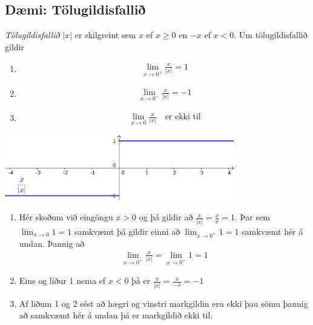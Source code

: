 \documentclass[a4paper,10pt,icelandic]{sphinxmanual}
\begin{document}
\subsection{Dæmi: Tölugildisfallið}
\label{kafli02:daemi-tolugildisfalli}
\textit{Tölugildisfallið} \(|x|\) er skilgreint sem \(x\)
ef \(x\geq 0\) en \(-x\) ef \(x<0\). Um tölugildisfallið gildir
\begin{enumerate}
\item {} \begin{equation*}
\begin{split}\lim_{x\to 0^+} \frac x{|x|} = 1\end{split}
\end{equation*}
\item {} \begin{equation*}
\begin{split}\lim_{x\to 0^-} \frac x{|x|} = -1\end{split}
\end{equation*}
\item {} \begin{equation*}
\begin{split}\lim_{x\to 0} \frac x{|x|} \quad \text{er ekki til}\end{split}
\end{equation*}
\end{enumerate}

\begin{center}
  \includegraphics[width=10cm]{02_daemi.png}          
    \end{center}  
\begin{enumerate}
\item {} 
Hér skoðum við eingöngu \(x>0\) og þá gildir að
\(\frac x{|x|} = \frac xx = 1\). Þar sem
\(\lim_{x \to 0} 1 = 1\) samkvæmt {\hyperref[kafli02:daemi2\string-1]{}}
þá gildir einni að \(\lim_{x \to 0^+} 1 = 1\) samkvæmt
{\hyperref[kafli02:setning\string-hv\string-markgildi]{}}
hér á undan. Þannig að
\begin{equation*}
\begin{split}\lim_{x \to 0^+} \frac x{|x|} =
\lim_{x \to 0^+} 1 = 1\end{split}
\end{equation*}
\item {} 
Eins og liður 1 nema ef \(x<0\) þá er
\(\frac x{|x|} = \frac x{-x} = -1\)

\item {} 
Af liðum 1 og 2 sést að hægri og vinstri markgildin eru ekki þau sömu þannig
að samkvæmt {\hyperref[kafli02:setning\string-hv\string-markgildi]{}} hér á undan þá er
markgildið ekki til.

\end{enumerate}
\end{document}
